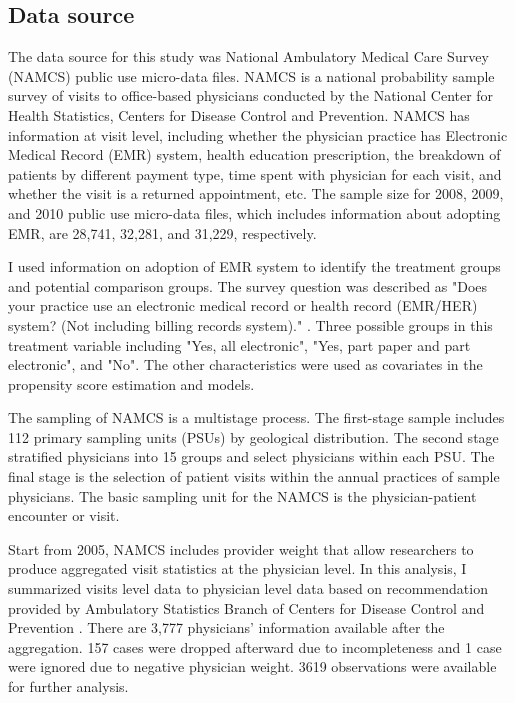 \subsection{Data source}
The data source for this study was National Ambulatory Medical Care Survey (NAMCS) public use micro-data files. NAMCS is a national probability sample survey of visits to office-based physicians conducted by the National Center for Health Statistics, Centers for Disease Control and Prevention. NAMCS has information at visit level, including whether the physician practice has Electronic Medical Record (EMR) system, health education prescription, the breakdown of patients by different payment type, time spent with physician for each visit, and whether the visit is a returned appointment, etc. The sample size for 2008, 2009, and 2010 public use micro-data files, which includes information about adopting EMR, are 28,741, 32,281, and 31,229, respectively.

I used information on adoption of EMR system to identify the treatment groups and potential comparison groups. The survey question was described as "Does your practice use an electronic medical record or health record (EMR/HER) system? (Not including billing records system)." \citep{NAMCSDOC2010}. Three possible groups in this treatment variable including "Yes, all electronic", "Yes, part paper and part electronic", and "No". The other characteristics were used as covariates in the propensity score estimation and models.

The sampling of NAMCS is a multistage process. The first-stage sample includes 112 primary sampling units (PSUs) by geological distribution. The second stage stratified physicians into 15 groups and select physicians within each PSU. The final stage is the selection of patient visits within the annual practices of sample physicians. The basic sampling unit for the NAMCS is the physician-patient encounter or visit. 

Start from 2005, NAMCS includes provider weight that allow researchers to produce aggregated visit statistics at the physician level. In this analysis, I summarized visits level data to physician level data based on recommendation provided by Ambulatory Statistics Branch of Centers for Disease Control and Prevention \citep{SasProcedure}. There are 3,777 physicians' information available after the aggregation. 157 cases were dropped afterward due to incompleteness and 1 case were ignored due to negative physician weight. 3619 observations were available for further analysis. 


